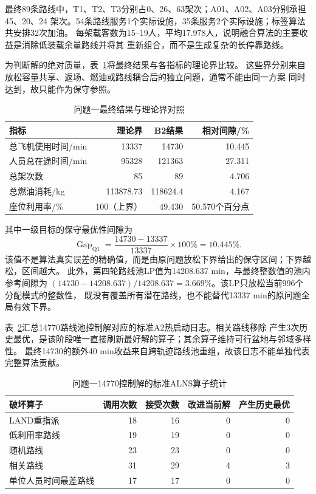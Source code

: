 \documentclass[UTF8,a4paper,zihao=5]{ctexart}
\begin{document}
最终89条路线中，T1、T2、T3分别占0、26、63架次；A01、A02、A03分别承担45、20、24
架次。54条路线服务1个实际设施，35条服务2个实际设施；标签算法共安排32次加油。
每架载客数为15--19人，平均17.978人，说明融合算法的主要收益是消除低装载余量路线并将其
重新组合，而不是生成复杂的长停靠路线。

为判断解的绝对质量，表~\ref{tab:q1-lower-bounds}将最终结果与各指标的理论界比较。
这些界分别来自放松容量共享、返场、燃油或路线耦合后的独立问题，通常不能由同一方案
同时达到，故只能作为保守参照。

\begin{table}[htbp]
  \centering
  \caption{问题一最终结果与理论界对照}
  \label{tab:q1-lower-bounds}
  \begin{tabular}{lrrr}
    \toprule
    指标 & 理论界 & B2结果 & 相对间隙/\% \\
    \midrule
    总飞机使用时间/min & 13337 & 14730 & 10.445 \\
    人员总在途时间/min & 95328 & 121363 & 27.311 \\
    总架次数 & 85 & 89 & 4.706 \\
    总燃油消耗/kg & 113878.73 & 118624.4 & 4.167 \\
    座位利用率/\% & 100（上界） & 49.430 & 50.570个百分点 \\
    \bottomrule
  \end{tabular}
\end{table}

其中一级目标的保守最优性间隙为
\begin{equation}
  \operatorname{Gap}_{\mathrm{Q1}}
  =\frac{14730-13337}{13337}\times100\%=10.445\%.
  \label{eq:q1-gap}
\end{equation}
该值不是算法真实误差的精确值，而是由原问题放松下界给出的保守区间；下界越松，区间越大。
此外，第四轮路线池LP值为14208.637 min，与最终整数值的池内参考间隙为
$ (14730-14208.637)/14208.637=3.669\%$。该LP只放松当前996个分配模式的整数性，
既没有覆盖所有潜在路线，也不能替代13337 min的原问题全局有效下界。

表~\ref{tab:q1-operator-stats}汇总14770路线池控制解对应的标准A2热启动日志。相关路线移除
产生3次历史最优，是该阶段唯一直接刷新最好解的算子；其余算子维持可行盆地与邻域多样性。
最终14730的额外40 min收益来自跨轨迹路线池重组，故该日志不能单独代表完整算法贡献。

\begin{table}[htbp]
  \centering
  \caption{问题一14770控制解的标准ALNS算子统计}
  \label{tab:q1-operator-stats}
  \begin{tabular}{lrrrr}
    \toprule
    破坏算子 & 调用次数 & 接受次数 & 改进当前解 & 产生历史最优 \\
    \midrule
    LAND重指派 & 18 & 16 & 0 & 0 \\
    低利用率路线 & 19 & 19 & 0 & 0 \\
    随机路线 & 23 & 23 & 0 & 0 \\
    相关路线 & 31 & 29 & 4 & 3 \\
    单位人员时间最差路线 & 17 & 17 & 0 & 0 \\
    \bottomrule
  \end{tabular}
\end{table}
\end{document}
